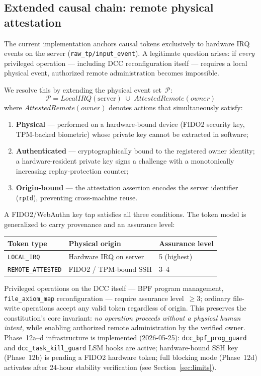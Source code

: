 \documentclass[11pt,a4paper,twoside]{article}
\begin{document}
\subsection{Extended causal chain: remote physical attestation}
\label{sec:remote-attestation}

The current implementation anchors causal tokens exclusively to hardware IRQ events
on the server (\texttt{raw\_tp/input\_event}).  A legitimate question arises: if
\emph{every} privileged operation — including DCC reconfiguration itself — requires
a local physical event, authorized remote administration becomes impossible.

We resolve this by extending the physical event set~$\mathcal{P}$:
\[
  \mathcal{P} = \mathit{LocalIRQ}(\text{server})
             \;\cup\;
             \mathit{AttestedRemote}(\mathit{owner})
\]
where $\mathit{AttestedRemote}(\mathit{owner})$ denotes actions that simultaneously
satisfy:
\begin{enumerate}[topsep=2pt,itemsep=1pt]
  \item \textbf{Physical} — performed on a hardware-bound device (FIDO2 security
        key, TPM-backed biometric) whose private key cannot be extracted in software;
  \item \textbf{Authenticated} — cryptographically bound to the registered owner
        identity; a hardware-resident private key signs a challenge with a
        monotonically increasing replay-protection counter;
  \item \textbf{Origin-bound} — the attestation assertion encodes the server
        identifier (\texttt{rpId}), preventing cross-machine reuse.
\end{enumerate}

A FIDO2/WebAuthn key tap satisfies all three conditions.  The token model is
generalized to carry provenance and an assurance level:

\begin{center}\small
\begin{tabular}{@{}lll@{}}
\toprule
\textbf{Token type} & \textbf{Physical origin} & \textbf{Assurance level} \\ \midrule
\texttt{LOCAL\_IRQ}       & Hardware IRQ on server & 5 (highest) \\
\texttt{REMOTE\_ATTESTED} & FIDO2 / TPM-bound SSH  & 3--4 \\
\bottomrule
\end{tabular}
\end{center}

Privileged operations on the DCC itself — BPF program management,
\texttt{file\_axiom\_map} reconfiguration — require assurance level~$\geq 3$;
ordinary file-write operations accept any valid token regardless of origin.
This preserves the constitution's core invariant: \emph{no operation proceeds
without a physical human intent}, while enabling authorized remote
administration by the verified owner.  Phase~12a--d infrastructure is
implemented (2026-05-25): \texttt{dcc\_bpf\_prog\_guard} and
\texttt{dcc\_task\_kill\_guard} LSM hooks are active; hardware-bound SSH key
(Phase~12b) is pending a FIDO2 hardware token; full blocking mode
(Phase~12d) activates after 24-hour stability verification
(see Section~\ref{sec:limits}).
\end{document}
